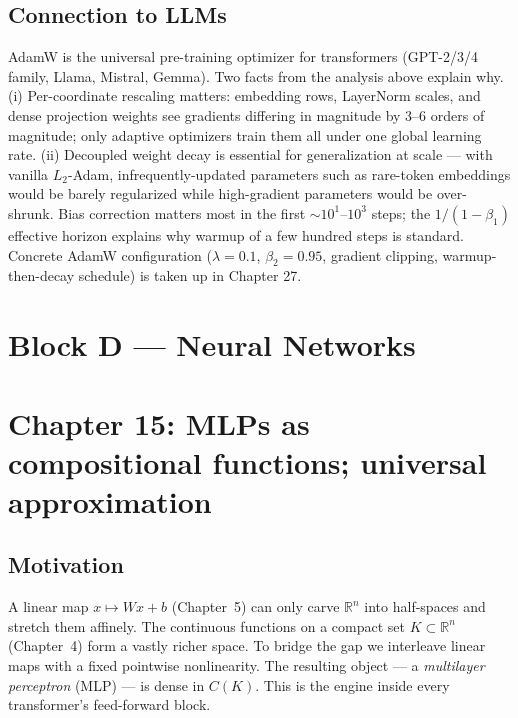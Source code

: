 \documentclass[11pt]{article}
\theoremstyle{remark}
\begin{document}
\subsection*{Connection to LLMs}

AdamW is the universal pre-training optimizer for transformers (GPT-2/3/4 family, Llama, Mistral, Gemma). Two facts from the analysis above explain why. (i) Per-coordinate rescaling matters: embedding rows, LayerNorm scales, and dense projection weights see gradients differing in magnitude by 3--6 orders of magnitude; only adaptive optimizers train them all under one global learning rate. (ii) Decoupled weight decay is essential for generalization at scale --- with vanilla $L_2$-Adam, infrequently-updated parameters such as rare-token embeddings would be barely regularized while high-gradient parameters would be over-shrunk. Bias correction matters most in the first $\sim 10^1$--$10^3$ steps; the $1/(1-\beta_1)$ effective horizon explains why warmup of a few hundred steps is standard. Concrete AdamW configuration ($\lambda = 0.1$, $\beta_2 = 0.95$, gradient clipping, warmup-then-decay schedule) is taken up in Chapter 27.



\section*{Block D --- Neural Networks}

\section*{Chapter 15: MLPs as compositional functions; universal approximation}

\subsection*{Motivation}

A linear map $x \mapsto Wx + b$ (Chapter~5) can only carve $\mathbb{R}^n$ into half-spaces and stretch them affinely. The continuous functions on a compact set $K \subset \mathbb{R}^n$ (Chapter~4) form a vastly richer space. To bridge the gap we interleave linear maps with a fixed pointwise nonlinearity. The resulting object --- a \emph{multilayer perceptron} (MLP) --- is dense in $C(K)$. This is the engine inside every transformer's feed-forward block.
\end{document}

